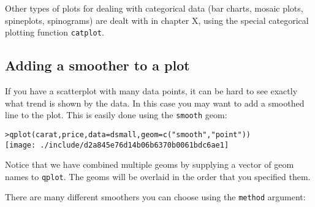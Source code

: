 Other types of plots for dealing with categorical data (bar charts, mosaic plots, spineplots, spinograms) are dealt with in chapter X, using the special categorical plotting function {\tt catplot}.

\subsection{Adding a smoother to a plot}\label{sub:smooth}

If you have a scatterplot with many data points, it can be hard to see exactly what trend is shown by the data.  In this case you may want to add a smoothed line to the plot.  This is easily done using the {\tt smooth} geom:

\begin{alltt}
> qplot(carat, price, data = dsmall, geom = c("smooth", "point"))
\texttt{[image: ./include/d2a845e76d14b06b6370b0061bdc6ae1]}

\end{alltt}

Notice that we have combined multiple geoms by supplying a vector of geom names to {\tt qplot}.  The geoms will be overlaid in the order that you specified them.

There are many different smoothers you can choose using the {\tt method} argument:

